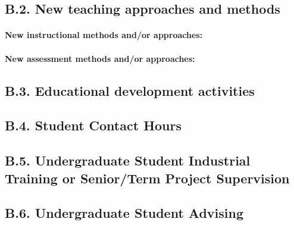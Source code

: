 \documentclass[12pt]{article}
\begin{document}
\subsection*{B.2. New teaching approaches and methods}

\paragraph{New instructional methods and/or approaches:}

\paragraph{New assessment methods and/or approaches:}

\subsection*{B.3. Educational development activities}

\subsection*{B.4. Student Contact Hours}

\subsection*{B.5. Undergraduate Student Industrial Training or Senior/Term Project Supervision}


\subsection*{B.6. Undergraduate Student Advising}
\end{document}
